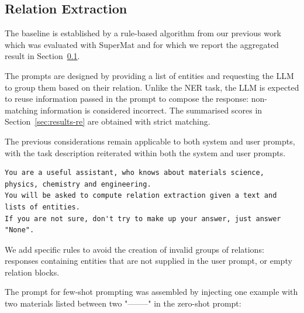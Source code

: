 \subsection{Relation Extraction}
\label{sec:re}
The baseline is established by a rule-based algorithm from our previous work~\cite{lfoppiano2023automatic} which was evaluated with SuperMat and for which we report the aggregated result in Section~\ref{sec:re}. 

The prompts are designed by providing a list of entities and requesting the LLM to group them based on their relation. 
Unlike the NER task, the LLM is expected to reuse information passed in the prompt to compose the response: non-matching information is considered incorrect.
The summarised scores in Section~\ref{sec:results-re} are obtained with strict matching. 

The previous considerations remain applicable to both system and user prompts, with the task description reiterated within both the system and user prompts. 

\begin{lstlisting}[caption=System prompt for RE modified by emphasising the tasks]
You are a useful assistant, who knows about materials science, physics, chemistry and engineering.
You will be asked to compute relation extraction given a text and lists of entities. 
If you are not sure, don't try to make up your answer, just answer "None". 
\end{lstlisting}

We add specific rules to avoid the creation of invalid groups of relations: responses containing entities that are not supplied in the user prompt, or empty relation blocks. 


    

The prompt for few-shot prompting was assembled by injecting one example with two materials listed between two "--------" in the zero-shot prompt:

